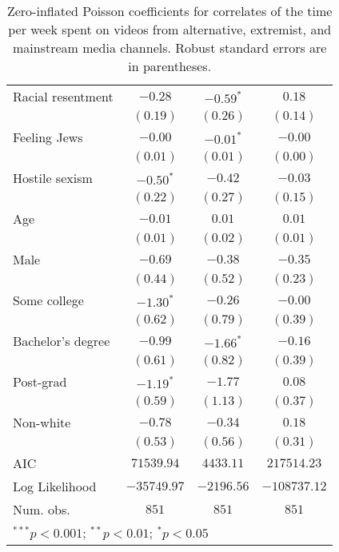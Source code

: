 \begin{table}
\begin{center}
\begin{tabular}{l c c c}
Racial resentment & $-0.28$      & $-0.59^{*}$  & $0.18$       \\
                  & $(0.19)$     & $(0.26)$     & $(0.14)$     \\
Feeling Jews      & $-0.00$      & $-0.01^{*}$  & $-0.00$      \\
                  & $(0.01)$     & $(0.01)$     & $(0.00)$     \\
Hostile sexism    & $-0.50^{*}$  & $-0.42$      & $-0.03$      \\
                  & $(0.22)$     & $(0.27)$     & $(0.15)$     \\
Age               & $-0.01$      & $0.01$       & $0.01$       \\
                  & $(0.01)$     & $(0.02)$     & $(0.01)$     \\
Male              & $-0.69$      & $-0.38$      & $-0.35$      \\
                  & $(0.44)$     & $(0.52)$     & $(0.23)$     \\
Some college      & $-1.30^{*}$  & $-0.26$      & $-0.00$      \\
                  & $(0.62)$     & $(0.79)$     & $(0.39)$     \\
Bachelor's degree & $-0.99$      & $-1.66^{*}$  & $-0.16$      \\
                  & $(0.61)$     & $(0.82)$     & $(0.39)$     \\
Post-grad         & $-1.19^{*}$  & $-1.77$      & $0.08$       \\
                  & $(0.59)$     & $(1.13)$     & $(0.37)$     \\
Non-white         & $-0.78$      & $-0.34$      & $0.18$       \\
                  & $(0.53)$     & $(0.56)$     & $(0.31)$     \\
\midrule
AIC               & $71539.94$   & $4433.11$    & $217514.23$  \\
Log Likelihood    & $-35749.97$  & $-2196.56$   & $-108737.12$ \\
Num. obs.         & $851$        & $851$        & $851$        \\
\bottomrule
\multicolumn{4}{l}{\scriptsize{$^{***}p<0.001$; $^{**}p<0.01$; $^{*}p<0.05$}}
\end{tabular}
\caption{Zero-inflated Poisson coefficients for correlates of the time per week spent on videos from alternative, extremist, and mainstream media channels. Robust standard errors are in parentheses.}
\label{tab:figa5table}
\end{center}
\end{table}
